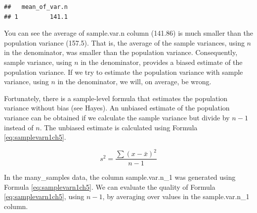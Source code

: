 \documentclass[
]{krantz}
\makeatletter
\newenvironment{Shaded}{\begin{snugshade}}{\end{snugshade}}
\newcommand{\DataTypeTok}[1]{\textcolor[rgb]{0.27,0.27,0.27}{#1}}
\newcommand{\DecValTok}[1]{\textcolor[rgb]{0.06,0.06,0.06}{#1}}
\newcommand{\KeywordTok}[1]{\textcolor[rgb]{0.27,0.27,0.27}{\textbf{#1}}}
\newcommand{\NormalTok}[1]{#1}
\newcommand{\OperatorTok}[1]{\textcolor[rgb]{0.43,0.43,0.43}{\textbf{#1}}}
\newcommand{\StringTok}[1]{\textcolor[rgb]{0.5,0.5,0.5}{#1}}
\newenvironment{kframe}{%
\medskip{}
\setlength{\fboxsep}{.8em}
 \def\at@end@of@kframe{}%
 \ifinner\ifhmode%
  \def\at@end@of@kframe{\end{minipage}}%
  \begin{minipage}{\columnwidth}%
 \fi\fi%
 \def\FrameCommand##1{\hskip\@totalleftmargin \hskip-\fboxsep
 \colorbox{shadecolor}{##1}\hskip-\fboxsep
     \hskip-\linewidth \hskip-\@totalleftmargin \hskip\columnwidth}%
 \MakeFramed {\advance\hsize-\width
   \@totalleftmargin\z@ \linewidth\hsize
   \@setminipage}}%
 {\par\unskip\endMakeFramed%
 \at@end@of@kframe}
\renewenvironment{Shaded}{\begin{kframe}}{\end{kframe}}
\makeatother
\begin{document}
\begin{Shaded}
\end{Shaded}

\begin{verbatim}
##   mean_of_var.n
## 1         141.1
\end{verbatim}

You can see the average of sample.var.n column (141.86) is much smaller than the population variance (157.5). That is, the average of the sample variances, using \(n\) in the denominator, was smaller than the population variance. Consequently, sample variance, using \(n\) in the denominator, provides a biased estimate of the population variance. If we try to estimate the population variance with sample variance, using \(n\) in the denominator, we will, on average, be wrong.

Fortunately, there is a sample-level formula that estimates the population variance without bias (see Hayes). An unbiased estimate of the population variance can be obtained if we calculate the sample variance but divide by \(n - 1\) instead of \(n\). The unbiased estimate is calculated using Formula \eqref{eq:samplevarn1ch5}.

\begin{equation} 
s^2 = \frac{\sum{(x - \bar{x})^2}}{n-1}
      \label{eq:samplevarn1ch5}
\end{equation}

In the many\_samples data, the column sample.var.n\_1 was generated using Formula \eqref{eq:samplevarn1ch5}. We can evaluate the quality of Formula \eqref{eq:samplevarn1ch5}, using \(n-1\), by averaging over values in the sample.var.n\_1 column.

\begin{Shaded}
\end{Shaded}
\end{document}
